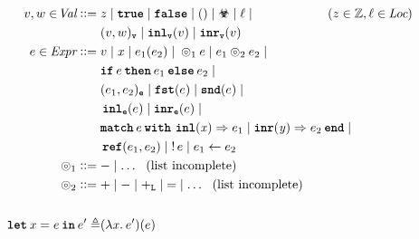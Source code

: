 \documentclass[thesis.tex]{subfiles}
\begin{document}
\begin{figure}[ht]
  \begin{center}
    \begin{align*}
      \val,\valB \in \Val \bnfdef{}       &
      z \mid
      \True \mid \False \mid
      \TT \mid
      \poison \mid
      \loc \mid                     \hspace*{2cm} (z \in \integer, \loc \in \Loc)                                        \\&
      (\val,\valB)_\valForm \mid
      \InlV(\val) \mid
      \InrV(\val)                                                                                                        \\
      \expr \in \Expr \bnfdef{}           &
      \val \mid
      \lvar \mid
      \expr_1(\expr_2) \mid
      {}
      \HLOp_1 \expr \mid
      \expr_1 \HLOp_2 \expr_2 \mid                                                                                       \\ &
      \If \expr then \expr_1 \Else \expr_2 \mid
      {}                                                                                                                 \\ &
      (\expr_1,\expr_2)_\exprForm \mid
      \Fst(\expr) \mid
      \Snd(\expr) \mid
      {}                                                                                                                 \\ &
      \InlE(\expr) \mid
      \InrE(\expr) \mid                                                                                                  \\ &
      \Match \expr with \Inl(\lvar) => \expr_1 | \Inr(\lvarB) => \expr_2 end \mid
      {}                                                                                                                 \\ &
      \Alloc(\expr_1,\expr_2) \mid
      \deref \expr \mid
      \expr_1 \gets \expr_2                                                                                              \\
      \HLOp_1 \bnfdef{}                   & - \mid \ldots ~~\text{(list incomplete)}                                     \\
      \HLOp_2 \bnfdef{}                   & + \mid - \mid \Ptradd \mid \mathop{=} \mid \ldots ~~\text{(list incomplete)}
      \\\\
      \Let \lvar = \expr in \expr' \eqdef & (\Lam \lvar. \expr')(\expr)                                                  \\

\end{align*}
\end{center}
\end{figure}
\end{document}
